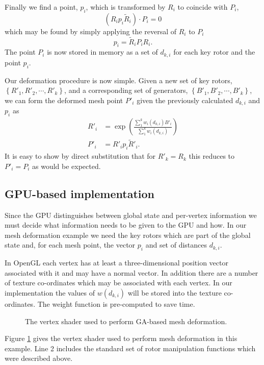 Finally we find a point, $p_i$, which is transformed by $R_i$ to coincide
with $P_i$,
\[
(R_i p_i \tilde{R}_i) \cdot P_i = 0
\]
which may be found by simply applying the reversal of $R_i$ to $P_i$
\[
p_i = \tilde{R}_i P_i R_i.
\]
The point $P_i$ is now stored in memory as a set of $d_{k,i}$ for each
key rotor and the point $p_i$.

Our deformation procedure is now simple. Given a new set of key rotors,
$\left\{ R'_1, R'_2, \cdots, R'_k \right\}$, and a corresponding set of
generators, $\left\{B'_1, B'_2, \cdots, B'_k\right\}$, we can form the deformed
mesh point $P'_i$ given the previously calculated $d_{k,i}$ and $p_i$ as
\begin{align}
R'_i &= 
\exp\left(\frac{\sum^{k}_1 w_i(d_{k,i}) B'_i}{\sum^{k}_1 w_i(d_{k,i})}\right) \label{eqn:summation} \\
P'_i &= R'_i p_i \tilde{R}'_i.
\end{align}
It is easy to show by direct substitution that for $R'_k = R_k$ this 
reduces to $P'_i = P_i$ as would be expected.

\subsection{GPU-based implementation}

Since the GPU distinguishes between global state and per-vertex information we
must decide what information needs to be given to the GPU and how. In our mesh
deformation example we need the key rotors which are part of the global state
and, for each mesh point, the vector $p_i$ and set of distances $d_{k,i}$.

In OpenGL each vertex has at least a three-dimensional position vector associated 
with it and may have a normal vector. In addition there are a number of 
texture co-ordinates which may be associated with each vertex. In our implementation
the values of $w(d_{k,i})$ will be stored into the texture co-ordinates. The weight
function is pre-computed to save time.

\begin{figure}[p]
\centering
\scalebox{0.8}{
\begin{minipage}{\textwidth}
\singlespacing

\end{minipage}}
\caption{\label{fig:meshshader}The vertex shader used to perform GA-based mesh
deformation.}
\end{figure}

Figure \ref{fig:meshshader} gives the vertex shader used to perform mesh deformation in
this example. Line 2 includes the standard set of rotor manipulation functions which
were described above. 

